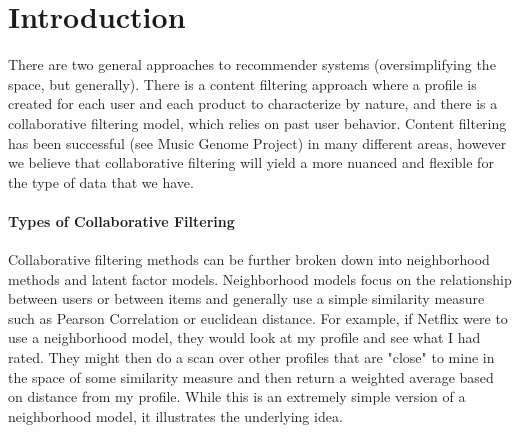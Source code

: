 \documentclass[fleqn,10pt]{SelfArx} %
\begin{document}
\flushbottom %

\maketitle %

\tableofcontents %

\thispagestyle{empty} %


\section*{Introduction} %


There are two general approaches to recommender systems (oversimplifying the space, but generally). There is a content filtering approach where a profile is created for each user and each product to characterize by nature, and there is a collaborative filtering model, which relies on past user behavior. Content filtering has been successful (see Music Genome Project) in many different areas, however we believe that collaborative filtering will yield a more nuanced and flexible for the type of data that we have.
\paragraph{Types of Collaborative Filtering}
Collaborative filtering methods can be further broken down into neighborhood methods and latent factor models. Neighborhood models focus on the relationship between users or between items and generally use a simple similarity measure such as Pearson Correlation or euclidean distance. For example, if Netflix were to use a neighborhood model, they would look at my profile and see what I had rated. They might then do a scan over other profiles that are "close" to mine in the space of some similarity measure and then return a weighted average based on distance from my profile. While this is an extremely simple version of a neighborhood model, it illustrates the underlying idea.\\
\end{document}
